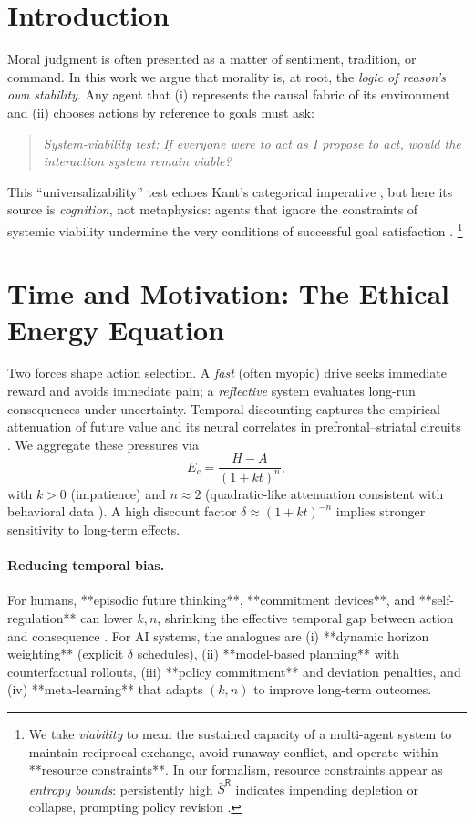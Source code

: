 \documentclass[11pt,a4paper]{article}
\begin{document}
\section{Introduction}
Moral judgment is often presented as a matter of sentiment, tradition, or command. In this work we argue that morality is, at root, the \emph{logic of reason’s own stability}. Any agent that (i) represents the causal fabric of its environment and (ii) chooses actions by reference to goals must ask:
\begin{quote}
\textit{System-viability test:} \emph{If everyone were to act as I propose to act, would the interaction system remain viable?}
\end{quote}
This “universalizability” test echoes Kant’s categorical imperative \cite{Kant1785}, but here its source is \textit{cognition}, not metaphysics: agents that ignore the constraints of systemic viability undermine the very conditions of successful goal satisfaction \cite{Rawls1971,Parfit1984}.%
\footnote{We take \emph{viability} to mean the sustained capacity of a multi-agent system to maintain reciprocal exchange, avoid runaway conflict, and operate within **resource constraints**. In our formalism, resource constraints appear as \emph{entropy bounds}: persistently high $\bar S^{\mathsf{R}}$ indicates impending depletion or collapse, prompting policy revision \cite{England2013}.}

\section{Time and Motivation: The Ethical Energy Equation}
Two forces shape action selection. A \emph{fast} (often myopic) drive seeks immediate reward and avoids immediate pain; a \emph{reflective} system evaluates long-run consequences under uncertainty. Temporal discounting captures the empirical attenuation of future value \cite{Ainslie1975,Frederick2002} and its neural correlates in prefrontal–striatal circuits \cite{KableGlimcher2007}. We aggregate these pressures via
\begin{equation}
E_c = \frac{H-A}{(1+k t)^n}, \label{eq:Ec}
\end{equation}
with $k>0$ (impatience) and $n\!\approx\!2$ (quadratic‐like attenuation consistent with behavioral data \cite{Ainslie1975,Frederick2002}). A high discount factor $\delta\!\approx\! (1+kt)^{-n}$ implies stronger sensitivity to long-term effects.

\paragraph{Reducing temporal bias.} For humans, **episodic future thinking**, **commitment devices**, and **self-regulation** can lower $k,n$, shrinking the effective temporal gap between action and consequence \cite{Mischel1989,Frederick2002}. For AI systems, the analogues are (i) **dynamic horizon weighting** (explicit $\delta$ schedules), (ii) **model-based planning** with counterfactual rollouts, (iii) **policy commitment** and deviation penalties, and (iv) **meta-learning** that adapts $(k,n)$ to improve long-term outcomes.
\end{document}

